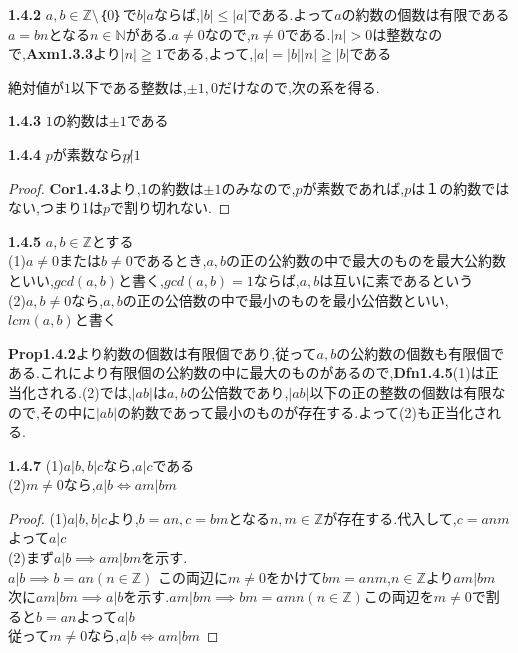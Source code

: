 \begin{prop}{\rm\bf1.4.2}
$a,b\in\mathbb{Z}\setminus {｛0｝}$で$b|a$ならば,$|b|\leq|a|$である.よって$a$の約数の個数は有限である
$a=bn$となる$n\in\mathbb{N}$がある.$a\ne0$なので,$n\ne0$である.$|n|>0$は整数なので,\textbf{Axm1.3.3}より$|n|\geqq1$である,よって,$|a|=|b||n|\geqq|b|$である
\end{prop}


絶対値が$1$以下である整数は,$\pm1,0$だけなので,次の系を得る.

\begin{cor}{\rm\bf1.4.3}
\quad $1$の約数は$\pm1$である
\end{cor}

\begin{cor}{\rm\bf1.4.4}
\quad $p$が素数なら$p\not|1$
\end{cor}
\begin{proof}
  \textbf{Cor1.4.3}より,1の約数は$\pm1$のみなので,$p$が素数であれば,$p$は１の約数ではない,つまり1は$p$で割り切れない.
\end{proof}

\begin{dfn}{\rm\bf1.4.5}
$a,b\in\mathbb{Z}$とする
\\(1)$a\ne0$または$b\ne0$であるとき,$a,b$の正の公約数の中で最大のものを最大公約数といい,$gcd(a,b)$と書く,$gcd(a,b)=1$ならば,$a,b$は互いに素であるという
\\(2)$a,b\ne0$なら,$a,b$の正の公倍数の中で最小のものを最小公倍数といい,$lcm(a,b)$と書く
\end{dfn}

\textbf{Prop1.4.2}より約数の個数は有限個であり,従って$a,b$の公約数の個数も有限個である.これにより有限個の公約数の中に最大のものがあるので,\textbf{Dfn1.4.5}(1)は正当化される.(2)では,$|ab|$は$a,b$の公倍数であり,$|ab|$以下の正の整数の個数は有限なので,その中に$|ab|$の約数であって最小のものが存在する.よって(2)も正当化される.

\begin{prop}{\rm\bf1.4.7}
(1)\quad $a|b,b|c$なら,$a|c$である
\\(2)\quad $m\ne0$なら,$a|b\iff am|bm$
\end{prop}

\begin{proof}
(1)\quad $a|b,b|c$より,$b=an,c=bm$となる$n,m\in\mathbb{Z}$が存在する.代入して,$c=anm$よって$a|c$
\\(2)\quad まず$a|b \implies am|bm$を示す.
\\$a|b \implies b=an(n\in\mathbb{Z})$ この両辺に$m\ne0$をかけて$bm=anm$,$n\in\mathbb{Z}$より$am|bm$
次に$am|bm \implies a|b$を示す.$am|bm \implies bm=amn(n\in\mathbb{Z})$この両辺を$m\ne0$で割ると$b=an$よって$a|b$
\\従って$m\ne0$なら,$a|b\iff am|bm$
\end{proof}

